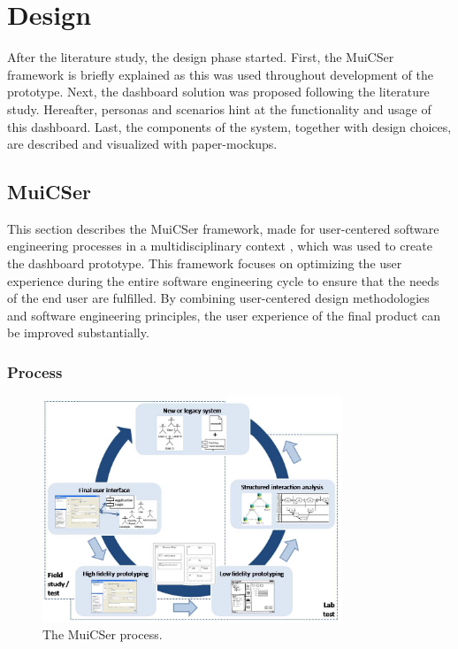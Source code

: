 \section{Design} \label{design}

After the literature study, the design phase started. First, the MuiCSer framework is briefly explained as this was used throughout development of the prototype. Next, the dashboard solution was proposed following the literature study. Hereafter, personas and scenarios hint at the functionality and usage of this dashboard. Last, the components of the system, together with design choices, are described and visualized with paper-mockups.

    \subsection{MuiCSer} \label{2_muicser}
    This section describes the MuiCSer framework, made for user-centered software engineering processes in a multidisciplinary context \cite{muicser}, which was used to create the dashboard prototype. This framework focuses on optimizing the user experience during the entire software engineering cycle to ensure that the needs of the end user are fulfilled. By combining user-centered design methodologies and software engineering principles, the user experience of the final product can be improved substantially.

        \subsubsection{Process}
        
        \begin{figure}[!t]
            \centering
            \includegraphics[width=0.8\textwidth]{chapters/3_design/muicser}
            \caption{The MuiCSer process.}\label{fig:muicser}
        \end{figure}

